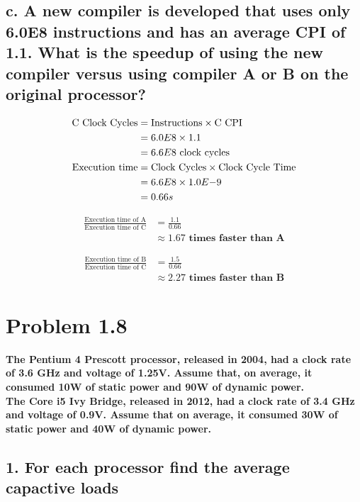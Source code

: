 \documentclass[11pt]{article}
\begin{document}
\subsection*{\small c. A new compiler is developed that uses only 6.0E8 instructions and has an average CPI of 1.1. What is the speedup of using the new compiler versus using compiler A or B on the original processor?}

\begin{align*}
\textrm{C Clock Cycles} & = \textrm{Instructions} \times \textrm{C CPI}\\
& = 6.0E8 \times 1.1\\
& = 6.6E8 \textrm{ clock cycles}\\
\textrm{Execution time} & = \textrm{Clock Cycles} \times \textmd{Clock Cycle Time}\\
& = 6.6E8 \times 1.0E{-9}\\
& = 0.66 s
\end{align*}

\begin{align*}
\frac{\textrm{Execution time of A}}{\textrm{Execution time of C}} & = \frac{1.1}{0.66}\\
& \approx \boldsymbol{1.67 \textrm{ times faster than A}}
\end{align*}

\begin{align*}
\frac{\textrm{Execution time of B}}{\textrm{Execution time of C}} & = \frac{1.5}{0.66}\\
& \approx \boldsymbol{2.27 \textrm{ times faster than B}}
\end{align*}
\section*{Problem 1.8}
\textbf{The Pentium 4 Prescott processor, released in 2004, had a clock rate of 3.6 GHz and voltage of 1.25V. Assume that, on average, it consumed 10W of static power and 90W of dynamic power.}\\

\noindent\textbf{The Core i5 Ivy Bridge, released in 2012, had a clock rate of 3.4 GHz and voltage of 0.9V. Assume that on average, it consumed 30W of static power and 40W of dynamic power.}

\subsection*{\small 1. For each processor find the average capactive loads}
\end{document}
